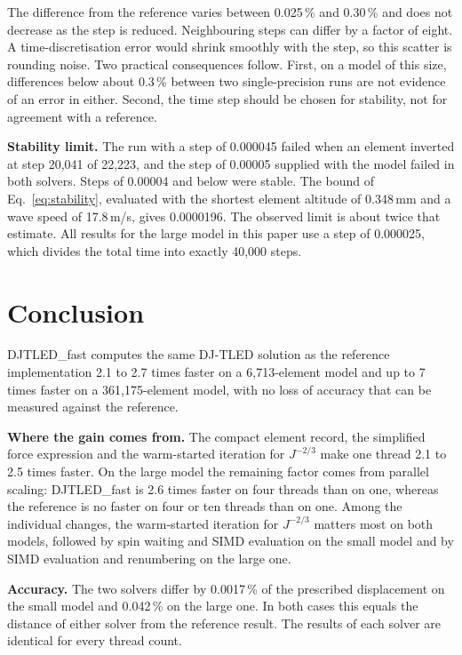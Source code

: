 \documentclass[11pt,a4paper]{article}
\newcommand{\DJF}{DJTLED\_fast}
\newcommand{\Jm}{J^{-2/3}}
\begin{document}
The difference from the reference varies between 0.025\,\% and 0.30\,\% and does not decrease as the step is reduced. Neighbouring steps can differ by a factor of eight. A time-discretisation error would shrink smoothly with the step, so this scatter is rounding noise. Two practical consequences follow. First, on a model of this size, differences below about 0.3\,\% between two single-precision runs are not evidence of an error in either. Second, the time step should be chosen for stability, not for agreement with a reference.

\textbf{Stability limit.} The run with a step of 0.000045 failed when an element inverted at step 20,041 of 22,223, and the step of 0.00005 supplied with the model failed in both solvers. Steps of 0.00004 and below were stable. The bound of Eq.~\eqref{eq:stability}, evaluated with the shortest element altitude of 0.348\,mm and a wave speed of 17.8\,m/s, gives 0.0000196. The observed limit is about twice that estimate. All results for the large model in this paper use a step of 0.000025, which divides the total time into exactly 40,000 steps.

\section{Conclusion}
\label{sec:conclusion}

\DJF{} computes the same DJ-TLED solution as the reference implementation 2.1 to 2.7 times faster on a 6,713-element model and up to 7 times faster on a 361,175-element model, with no loss of accuracy that can be measured against the reference.

\textbf{Where the gain comes from.} The compact element record, the simplified force expression and the warm-started iteration for $\Jm$ make one thread 2.1 to 2.5 times faster. On the large model the remaining factor comes from parallel scaling: \DJF{} is 2.6 times faster on four threads than on one, whereas the reference is no faster on four or ten threads than on one. Among the individual changes, the warm-started iteration for $\Jm$ matters most on both models, followed by spin waiting and SIMD evaluation on the small model and by SIMD evaluation and renumbering on the large one.

\textbf{Accuracy.} The two solvers differ by 0.0017\,\% of the prescribed displacement on the small model and 0.042\,\% on the large one. In both cases this equals the distance of either solver from the reference result. The results of each solver are identical for every thread count.
\end{document}
